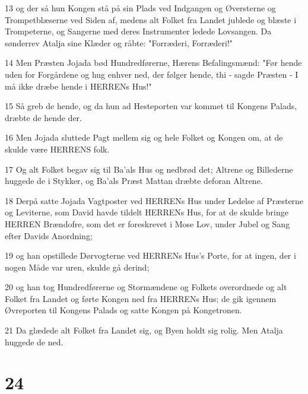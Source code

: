 \par 13 og der så hun Kongen stå på sin Plads ved Indgangen og Øversterne og Trompetblæserne ved Siden af, medens alt Folket fra Landet jublede og blæste i Trompeterne, og Sangerne med deres Instrumenter ledede Lovsangen. Da sønderrev Atalja sine Klæder og råbte: "Forræderi, Forræderi!"
\par 14 Men Præsten Jojada bød Hundredførerne, Hærens Befalingsmænd: "Før hende uden for Forgårdene og hug enhver ned, der følger hende, thi - sagde Præsten - I må ikke dræbe hende i HERRENs Hus!"
\par 15 Så greb de hende, og da hun ad Hesteporten var kommet til Kongens Palads, dræbte de hende der.
\par 16 Men Jojada sluttede Pagt mellem sig og hele Folket og Kongen om, at de skulde være HERRENS folk.
\par 17 Og alt Folket begav sig til Ba'als Hus og nedbrød det; Altrene og Billederne huggede de i Stykker, og Ba'als Præst Mattan dræbte deforan Altrene.
\par 18 Derpå satte Jojada Vagtposter ved HERRENs Hus under Ledelse af Præsterne og Leviterne, som David havde tildelt HERRENs Hus, for at de skulde bringe HERREN Brændofre, som det er foreskrevet i Mose Lov, under Jubel og Sang efter Davids Anordning;
\par 19 og han opstillede Dørvogterne ved HERRENs Hus's Porte, for at ingen, der i nogen Måde var uren, skulde gå derind;
\par 20 og han tog Hundredførerne og Stormændene og Folkets overordnede og alt Folket fra Landet og førte Kongen ned fra HERRENs Hus; de gik igennem Øvreporten til Kongens Palads og satte Kongen på Kongetronen.
\par 21 Da glædede alt Folket fra Landet sig, og Byen holdt sig rolig. Men Atalja huggede de ned.

\chapter{24}

